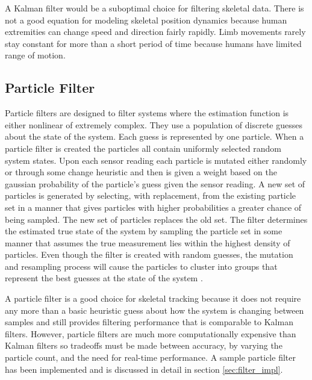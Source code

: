 A Kalman filter would be a suboptimal choice for filtering skeletal data. There is not a good equation for modeling skeletal position dynamics because human extremities can change speed and direction fairly rapidly. Limb movements rarely stay constant for more than a short period of time because humans have limited range of motion. 

\subsection{Particle Filter}

Particle filters are designed to filter systems where the estimation function is either nonlinear of extremely complex. They use a population of discrete guesses about the state of the system. Each guess is represented by one particle. When a particle filter is created the particles all contain uniformly selected random system states. Upon each sensor reading each particle is mutated either randomly or through some change heuristic and then is given a weight based on the gaussian probability of the particle’s guess given the sensor reading. A new set of particles is generated by selecting, with replacement, from the existing particle set in a manner that gives particles with higher probabilities a greater chance of being sampled. The new set of particles replaces the old set. The filter determines the estimated true state of the system by sampling the particle set in some manner that assumes the true measurement lies within the highest density of particles. Even though the filter is created with random guesses, the mutation and resampling process will cause the particles to cluster into groups that represent the best guesses at the state of the system \cite{sanjeev2002tutorial}. 

A particle filter is a good choice for skeletal tracking because it does not require any more than a basic heuristic guess about how the system is changing between samples and still provides filtering performance that is comparable to Kalman filters. However, particle filters are much more computationally expensive than Kalman filters so tradeoffs must be made between accuracy, by varying the particle count, and the need for real-time performance. A sample particle filter has been implemented and is discussed in detail in section \ref{sec:filter_impl}.